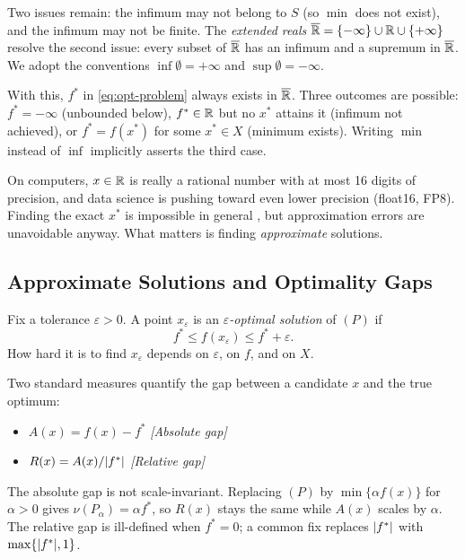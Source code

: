 Two issues remain: the infimum may not belong to $S$ (so $\min$ does not exist), and the infimum may not be finite.
The \emph{extended reals} $\overline{\mathbb{R}} = \{-\infty\} \cup \mathbb{R} \cup \{+\infty\}$ resolve the second issue: every subset of $\overline{\mathbb{R}}$ has an infimum and a supremum in $\overline{\mathbb{R}}$.
We adopt the conventions $\inf \emptyset = +\infty$ and $\sup \emptyset = -\infty$.

With this, $f^*$ in \cref{eq:opt-problem} always exists in $\overline{\mathbb{R}}$.
Three outcomes are possible: $f^* = -\infty$ (unbounded below), $f^* \in \mathbb{R}$ but no $x^*$ attains it (infimum not achieved), or $f^* = f(x^*)$ for some $x^* \in X$ (minimum exists).
Writing $\min$ instead of $\inf$ implicitly asserts the third case.

On computers, $x \in \mathbb{R}$ is really a rational number with at most 16 digits of precision, and data science is pushing toward even lower precision (float16, FP8).
Finding the exact $x^*$ is impossible in general \cite{hansen1995}, but approximation errors are unavoidable anyway.
What matters is finding \emph{approximate} solutions.


\subsection{Approximate Solutions and Optimality Gaps}\label{sec:solution-quality}

\begin{definition}\label{def:approx-solution}
	Fix a tolerance $\varepsilon > 0$.
	A point $x_\varepsilon$ is an \emph{$\varepsilon$-optimal solution} of $(P)$ if
	\begin{equation}\label{eq:eps-optimal}
		f^* \leq f(x_\varepsilon) \leq f^* + \varepsilon.
	\end{equation}
	How hard it is to find $x_\varepsilon$ depends on $\varepsilon$, on $f$, and on $X$.
\end{definition}

Two standard measures quantify the gap between a candidate $x$ and the true optimum:
\begin{itemize}
	\item $A(x) = f(x) - f^*$
		\hfill\textit{[Absolute gap]}
	\item $R(x) = A(x) / \lvert f^*\rvert$
		\hfill\textit{[Relative gap]}
\end{itemize}

The absolute gap is not scale-invariant. Replacing $(P)$ by $\min\{\alpha f(x)\}$ for $\alpha > 0$ gives $\nu(P_\alpha) = \alpha f^*$, so $R(x)$ stays the same while $A(x)$ scales by $\alpha$. The relative gap is ill-defined when $f^* = 0$; a common fix replaces $\lvert f^*\rvert$ with $\max\{\lvert f^*\rvert, 1\}$.

